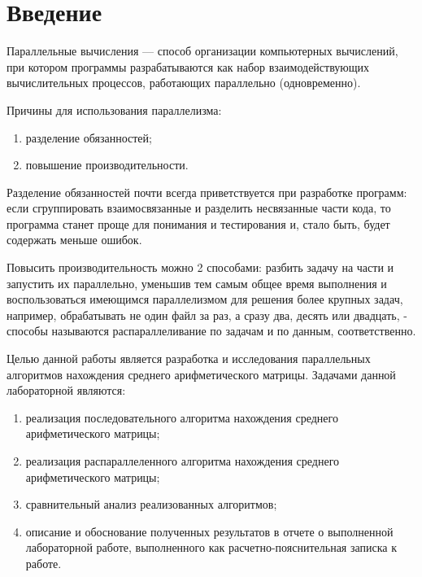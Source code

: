 \chapter*{Введение}\label{Input}



Параллельные вычисления — способ организации компьютерных вычислений, при котором программы разрабатываются как набор 
взаимодействующих вычислительных процессов, работающих параллельно (одновременно). 

Причины для использования параллелизма:

\begin{enumerate}
  \item разделение обязанностей;
  \item повышение производительности.
\end{enumerate}

Разделение обязанностей почти всегда приветствуется при разработке программ: если сгруппировать взаимосвязанные и разделить 
несвязанные части кода, то программа станет проще для понимания и тестирования и, стало быть, будет содержать меньше ошибок. 

Повысить производительность можно 2 способами: разбить задачу на части и запустить их
параллельно, уменьшив тем самым общее время выполнения и воспользоваться имеющимся параллелизмом для решения
более крупных задач, например, обрабатывать не один файл за раз, а сразу два, десять или двадцать, - способы 
называются распараллеливание по задачам и по данным, соответственно.

Целью данной работы является разработка и исследования параллельных алгоритмов нахождения среднего арифметического матрицы.
Задачами данной лабораторной являются:
\begin{enumerate}
  \item реализация последовательного алгоритма нахождения среднего арифметического матрицы;
  \item реализация распараллеленного алгоритма нахождения среднего арифметического матрицы;
  \item сравнительный анализ реализованных алгоритмов;
  \item описание и обоснование полученных результатов в отчете о выполненной лабораторной работе, выполненного как расчетно-пояснительная 
        записка к работе.
\end{enumerate}

